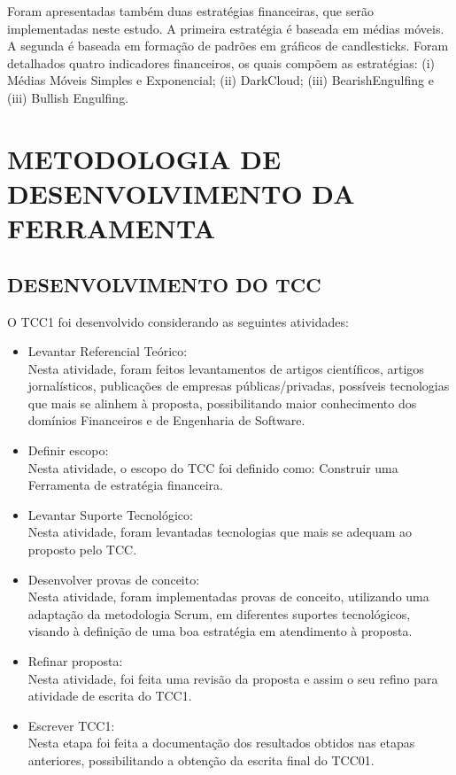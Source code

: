 Foram apresentadas também duas estratégias financeiras, que serão implementadas neste estudo. A primeira estratégia é baseada em médias móveis. A segunda é baseada em formação de padrões em gráficos de candlesticks. Foram detalhados quatro indicadores financeiros, os quais compõem as estratégias: (i) Médias Móveis Simples e Exponencial; (ii) DarkCloud; (iii) BearishEngulfing e (iii) Bullish Engulfing.

\newpage
\chapter[METODOLOGIA DE DESENVOLVIMENTO DA FERRAMENTA]{METODOLOGIA DE DESENVOLVIMENTO DA FERRAMENTA}
\section{DESENVOLVIMENTO DO TCC}

O TCC1 foi desenvolvido considerando as seguintes atividades:
\begin{itemize}
\item Levantar Referencial Teórico:\\ Nesta atividade, foram feitos levantamentos de artigos científicos, artigos jornalísticos, publicações de empresas públicas/privadas, possíveis tecnologias que mais se alinhem à proposta, possibilitando maior conhecimento dos domínios Financeiros e de Engenharia de Software.

\item Definir escopo:\\  
Nesta atividade, o escopo do TCC foi definido como: Construir uma Ferramenta de estratégia financeira.
\item Levantar Suporte Tecnológico: \\
 Nesta atividade, foram levantadas tecnologias que mais se adequam ao proposto pelo TCC.
\item Desenvolver provas de conceito:\\ 
Nesta atividade, foram implementadas provas de conceito, utilizando uma adaptação da metodologia Scrum, em diferentes suportes tecnológicos, visando à definição de uma boa estratégia em atendimento à proposta.
\item Refinar proposta: \\
Nesta atividade, foi feita uma revisão da proposta e assim o seu refino para atividade de escrita do TCC1.
\item Escrever TCC1:\\ 
Nesta etapa foi feita a documentação dos resultados obtidos nas etapas anteriores, possibilitando a obtenção da escrita final do TCC01.
\end{itemize}

